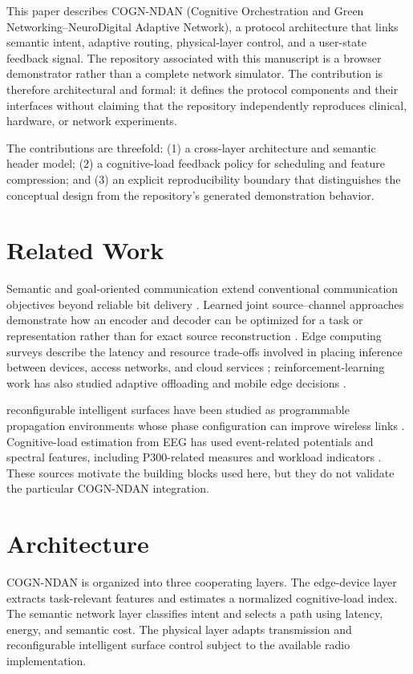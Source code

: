 \documentclass{BVP_CINC}
\newcommand{\RI}{reconfigurable intelligent surface}
\begin{document}
This paper describes COGN-NDAN (Cognitive Orchestration and Green Networking--NeuroDigital Adaptive Network), a protocol architecture that links semantic intent, adaptive routing, physical-layer control, and a user-state feedback signal. The repository associated with this manuscript is a browser demonstrator rather than a complete network simulator. The contribution is therefore architectural and formal: it defines the protocol components and their interfaces without claiming that the repository independently reproduces clinical, hardware, or network experiments.

The contributions are threefold: (1) a cross-layer architecture and semantic header model; (2) a cognitive-load feedback policy for scheduling and feature compression; and (3) an explicit reproducibility boundary that distinguishes the conceptual design from the repository's generated demonstration behavior.

\section{Related Work}
Semantic and goal-oriented communication extend conventional communication objectives beyond reliable bit delivery \cite{strinati2021,li2022semantic}. Learned joint source--channel approaches demonstrate how an encoder and decoder can be optimized for a task or representation rather than for exact source reconstruction \cite{xie2022semantic}. Edge computing surveys describe the latency and resource trade-offs involved in placing inference between devices, access networks, and cloud services \cite{bonomi2012fog,wang2020}; reinforcement-learning work has also studied adaptive offloading and mobile edge decisions \cite{mao2017learning}.

\RI{}s have been studied as programmable propagation environments whose phase configuration can improve wireless links \cite{wu2020towards,elmossallamy2020ris,alexandropoulos2021ris,yuan2021ris}. Cognitive-load estimation from EEG has used event-related potentials and spectral features, including P300-related measures and workload indicators \cite{sutton1965evoked,polich2007,holm2009}. These sources motivate the building blocks used here, but they do not validate the particular COGN-NDAN integration.

\section{Architecture}
COGN-NDAN is organized into three cooperating layers. The edge-device layer extracts task-relevant features and estimates a normalized cognitive-load index. The semantic network layer classifies intent and selects a path using latency, energy, and semantic cost. The physical layer adapts transmission and \RI{} control subject to the available radio implementation.
\end{document}
